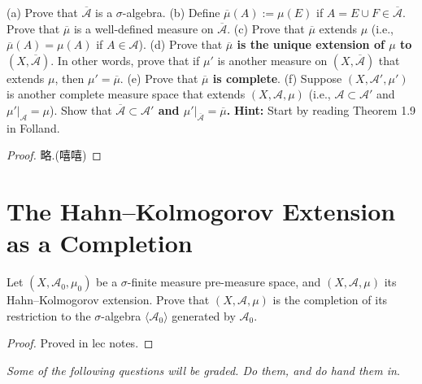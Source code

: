 \documentclass[lang=cn,11pt]{elegantbook}
\begin{document}
(a) Prove that \(\overline{\mathcal{A}}\) is a \(\sigma\)-algebra.
(b) Define \(\overline{\mu}(A) := \mu(E)\) if \(A = E \cup F \in \overline{\mathcal{A}}\). Prove that \(\overline{\mu}\) is a well-defined measure on \(\overline{\mathcal{A}}\).
(c) Prove that \(\overline{\mu}\) extends \(\mu\) (i.e., \(\overline{\mu}(A) = \mu(A)\) if \(A \in \mathcal{A}\)).
(d) Prove that\textbf{ \(\overline{\mu}\) is the unique extension of \(\mu\) to \((X, \overline{\mathcal{A}})\)}. In other words, prove that if \(\mu'\) is another measure on \((X, \overline{\mathcal{A}})\) that extends \(\mu\), then \(\mu' = \overline{\mu}\).
(e) Prove that \textbf{\(\overline{\mu}\) is complete}.
(f) Suppose \((X, \mathcal{A}', \mu')\) is another complete measure space that extends \((X, \mathcal{A}, \mu)\) (i.e., \(\mathcal{A} \subset \mathcal{A}'\) and \(\mu'|_{\mathcal{A}} = \mu\)). Show that \textbf{\(\overline{\mathcal{A}} \subset \mathcal{A}'\) and \(\mu'|_{\overline{\mathcal{A}}} = \overline{\mu}\).} 
\textbf{Hint:} Start by reading Theorem 1.9 in Folland.
\begin{proof}
    略.(嘻嘻)
\end{proof}


\section{The Hahn--Kolmogorov Extension as a Completion}
Let \((X, \mathcal{A}_0, \mu_0)\) be a \(\sigma\)-finite measure pre-measure space, and \((X, \mathcal{A}, \mu)\) its Hahn–Kolmogorov extension. Prove that \((X, \mathcal{A}, \mu)\) is the completion of its restriction to the \(\sigma\)-algebra \(\langle \mathcal{A}_0 \rangle\) generated by \(\mathcal{A}_0\).
\begin{proof}
    Proved in lec notes.
\end{proof}



\newpage
\begin{center}
\textit{Some of the following questions will be graded. Do them, and do hand them in}.
\end{center}
\end{document}
